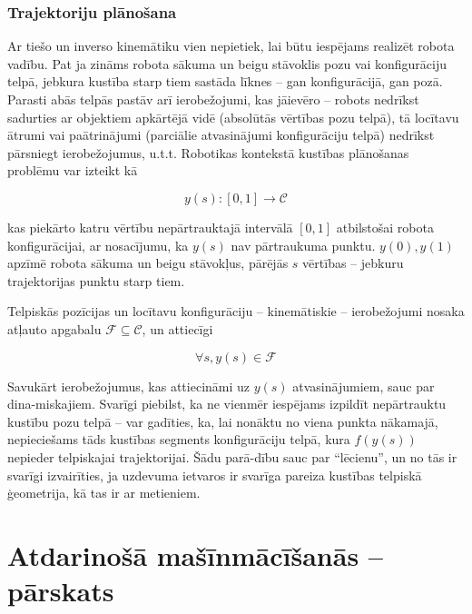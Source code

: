 \documentclass[12pt, a4paper]{article}
\numberwithin{equation}{section} %
\begin{document}
\subsubsection{Trajektoriju plānošana}

Ar tiešo un inverso kinemātiku vien nepietiek, lai būtu iespējams realizēt robota vadību. Pat ja zināms robota sākuma un beigu stāvoklis pozu vai konfigurāciju telpā, jebkura kustība starp tiem sastāda līknes -- gan konfigurācijā, gan pozā. Parasti abās telpās pastāv arī ierobežojumi, kas jāievēro -- robots nedrīkst sadurties ar objektiem apkārtējā vidē (absolūtās vērtības pozu telpā), tā locītavu ātrumi vai paātrinājumi (parciālie atvasinājumi konfigurāciju telpā) nedrīkst pārsniegt ierobežojumus, u.t.t. Robotikas kontekstā kustības plānošanas problēmu var izteikt kā \cite{motion_planning_illinois}

\begin{equation}
    y(s): [0,1] \rightarrow \mathcal{C}
\end{equation}

kas piekārto katru vērtību nepārtrauktajā intervālā $[0,1]$ atbilstošai robota konfigurācijai, ar nosacījumu, ka $y(s)$ nav pārtraukuma punktu. $y(0), y(1)$ apzīmē robota sākuma un beigu stāvokļus, pārējās $s$ vērtības -- jebkuru trajektorijas punktu starp tiem.

Telpiskās pozīcijas un locītavu konfigurāciju -- kinemātiskie -- ierobežojumi nosaka atļauto apgabalu $\mathcal{F} \subseteq \mathcal{C}$, un attiecīgi

\begin{equation}
    \forall s,y(s) \in \mathcal{F}
\end{equation}

Savukārt ierobežojumus, kas attiecināmi uz $y(s)$ atvasinājumiem, sauc par dina-miskajiem. Svarīgi piebilst, ka ne vienmēr iespējams izpildīt nepārtrauktu kustību pozu telpā -- var gadīties, ka, lai nonāktu no viena punkta nākamajā, nepieciešams tāds kustības segments konfigurāciju telpā, kura $f(y(s))$ nepieder telpiskajai trajektorijai. Šādu parā-dību sauc par ``lēcienu'', un no tās ir svarīgi izvairīties, ja uzdevuma ietvaros ir svarīga pareiza kustības telpiskā ģeometrija, kā tas ir ar metieniem.


%
%
%
%
%
%
%
%
%
%
%
%
%
%
%
%
%
%
%

\newpage
\section{Atdarinošā mašīnmācīšanās -- pārskats}
\end{document}
